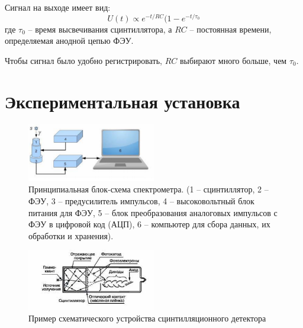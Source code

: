 \documentclass[a4paper, 12pt]{article}
\begin{document}
            Сигнал на выходе имеет вид:
            $$
                U(t) \propto e^{-t/RC}(1 - e^{-t/\tau_0}
            $$
            где $\tau_0$ -- время высвечивания сцинтиллятора, а $RC$ -- постоянная времени, определяемая анодной цепью ФЭУ.

            Чтобы сигнал было удобно регистрировать, $RC$ выбирают много больше, чем $\tau_0$.

    \section{Экспериментальная установка}

        \begin{figure}[h!]
            \begin{center}
                \includegraphics[width = 0.5\textwidth]{img/ust_labnik.png}
                \caption{Принципиальная блок-схема спектрометра. (1 – сцинтиллятор, 2 – ФЭУ, 3 – предусилитель импульсов, 4 – высоковольтный блок питания для ФЭУ, 5 – блок преобразования аналоговых импульсов с ФЭУ в цифровой код (АЦП), 6 – компьютер для сбора данных, их обработки и хранения).}
                \label{img:ust_labnik}
            \end{center}
        \end{figure}

        \begin{figure}[h!]
            \begin{center}
                \includegraphics[width = 0.5\textwidth]{img/ust.jpg}
                \caption{Пример схематического устройства сцинтилляционного детектора}
                \label{img:ust}
            \end{center}
        \end{figure}
\end{document}
